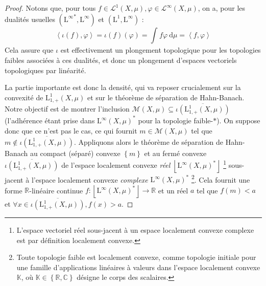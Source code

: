 \documentclass[a4paper,12pt]{article}
\newcommand{\R}{\mathbb{R}}
\newcommand{\C}{\mathbb{C}}
\newcommand{\K}{\mathbb{K}}
\newcommand{\ket}[1]{\left\langle #1 \right\rangle}
\newcommand{\floor}[1]{\left\lfloor #1 \right\rfloor}
\newcommand{\set}[1]{\left\{ #1 \right\}}
\newcommand{\integral}[4]{\int_{#1}^{#2} #3~\mathrm{d}#4}
\newcommand{\closure}[1]{\overline{#1}}
\begin{document}
\begin{proof}
    Notons que, pour tous $f\in\mathscr{L}^1(X, \mu), \varphi\in\mathscr{L}^\infty(X, \mu)$, on a, pour les dualités usuelles 
    $({\mathrm{L}^\infty}^*, \mathrm{L}^\infty)$ et $(\mathrm{L}^1, \mathrm{L}^\infty)$ :
    \begin{equation*}
        \ket{\iota(f), \varphi} = \iota(f)(\varphi) = \integral{}{}{f\varphi}{\mu} = \ket{f, \varphi}
    \end{equation*}
    Cela assure que $\iota$ est effectivement un plongement topologique pour les topologies faibles associées à ces dualités,
    et donc un plongement d'espaces vectoriels topologiques par linéarité.

    La partie importante est donc la densité, qui va reposer crucialement sur la convexité de $\mathrm{L}^1_{1, +}(X, \mu)$ et sur le théorème de séparation de Hahn-Banach.
    Notre objectif est de montrer l'inclusion $\mathcal{M}(X, \mu)\subseteq\closure{\iota(\mathrm{L}^1_{1, +}(X, \mu))}$ (l'adhérence étant prise dans 
    ${\mathrm{L}^\infty(X,\mu)}^*$ pour la topologie faible-$*$). On suppose donc que ce n'est pas le cas, ce qui fournit
    $m\in\mathcal{M}(X, \mu)$ tel que $m\notin\closure{\iota(\mathrm{L}^1_{1, +}(X, \mu))}$. Appliquons alors le théorème de séparation de
    Hahn-Banach au compact (séparé) convexe $\set{m}$ et au fermé convexe $\closure{\iota(\mathrm{L}^1_{1, +}(X, \mu))}$
    de l'espace localement convexe \emph{réel} $\floor{\mathrm{L}^\infty(X,\mu)^*}$
    \footnote{L'espace vectoriel réel sous-jacent à un espace localement convexe complexe
    est par définition localement convexe. } 
    sous-jacent à l'espace localement convexe \emph{complexe} $\mathrm{L}^\infty(X,\mu)^*$
    \footnote{Toute topologie faible est localement convexe, comme topologie initiale 
    pour une famille d'applications linéaires à valeurs dans l'espace localement convexe $\K$, où $\K\in\set{\R, \C}$ 
    désigne le corps des scalaires. }. 
    Cela fournit une forme $\R$-linéaire continue $f : \floor{\mathrm{L}^\infty(X,\mu)^*} \to \R$ et un réel 
    $a$ tel que $f(m)<a$ et $\forall x\in \closure{\iota(\mathrm{L}^1_{1, +}(X, \mu))}, f(x)>a$. 


\end{proof}
\end{document}
